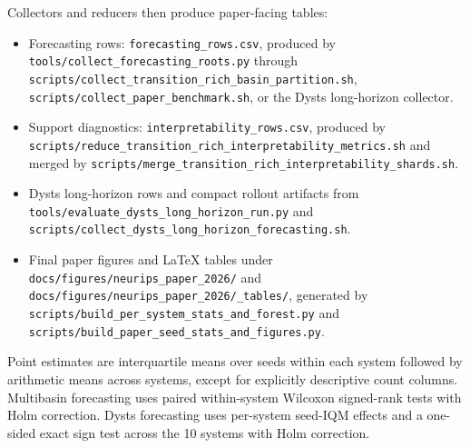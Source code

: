 Collectors and reducers then produce paper-facing tables:
\begin{itemize}
  \item Forecasting rows: \texttt{forecasting\_rows.csv}, produced by
  \texttt{tools/collect\_forecasting\_roots.py} through
  \texttt{scripts/collect\_transition\_rich\_basin\_partition.sh},
  \texttt{scripts/collect\_paper\_benchmark.sh}, or the Dysts long-horizon
  collector.
  \item Support diagnostics: \texttt{interpretability\_rows.csv}, produced by
  \texttt{scripts/reduce\_transition\_rich\_interpretability\_metrics.sh} and
  merged by \texttt{scripts/merge\_transition\_rich\_interpretability\_shards.sh}.
  \item Dysts long-horizon rows and compact rollout artifacts from
  \texttt{tools/evaluate\_dysts\_long\_horizon\_run.py} and
  \texttt{scripts/collect\_dysts\_long\_horizon\_forecasting.sh}.
  \item Final paper figures and LaTeX tables under
  \texttt{docs/figures/neurips\_paper\_2026/} and
  \texttt{docs/figures/neurips\_paper\_2026/\_tables/}, generated by
  \texttt{scripts/build\_per\_system\_stats\_and\_forest.py} and
  \texttt{scripts/build\_paper\_seed\_stats\_and\_figures.py}.
\end{itemize}

Point estimates are interquartile means over seeds within each system followed
by arithmetic means across systems, except for explicitly descriptive count
columns. Multibasin forecasting uses paired within-system Wilcoxon signed-rank
tests with Holm correction. Dysts forecasting uses per-system seed-IQM effects
and a one-sided exact sign test across the 10 systems with Holm correction.
